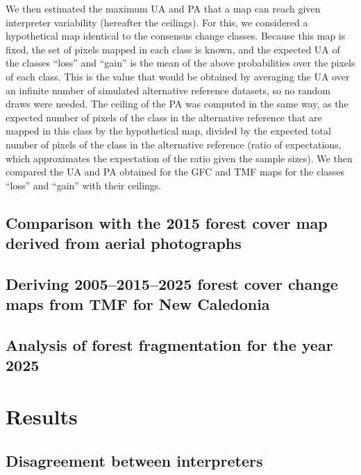 \documentclass[paper=a4, fontsize=12pt, DIV=13, english, dvipsnames]{scrartcl}
\begin{document}
We then estimated the maximum UA and PA that a map can reach given interpreter variability (hereafter the ceilings). For this, we considered a hypothetical map identical to the consensus change classes. Because this map is fixed, the set of pixels mapped in each class is known, and the expected UA of the classes ``loss'' and ``gain'' is the mean of the above probabilities over the pixels of each class. This is the value that would be obtained by averaging the UA over an infinite number of simulated alternative reference datasets, so no random draws were needed. The ceiling of the PA was computed in the same way, as the expected number of pixels of the class in the alternative reference that are mapped in this class by the hypothetical map, divided by the expected total number of pixels of the class in the alternative reference (ratio of expectations, which approximates the expectation of the ratio given the sample sizes). We then compared the UA and PA obtained for the GFC and TMF maps for the classes ``loss'' and ``gain'' with their ceilings.
\subsection{Comparison with the 2015 forest cover map derived from aerial photographs}
\label{sec:orgd64eb3c}

\subsection{Deriving 2005--2015--2025 forest cover change maps from TMF for New Caledonia}
\label{sec:org5e3cd76}

\subsection{Analysis of forest fragmentation for the year 2025}
\label{sec:org1ff020b}

\newpage
\section{Results}
\label{sec:org360e2a1}

\subsection{Disagreement between interpreters}
\label{sec:orgbd807f9}
\end{document}

